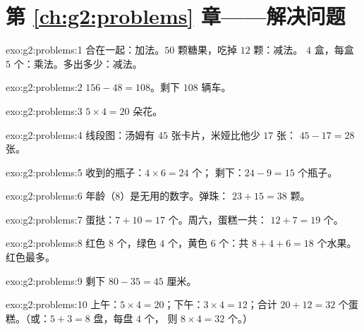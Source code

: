 \section*{第 \ref{ch:g2:problems} 章——解决问题}

\begin{solution}{exo:g2:problems:1}
合在一起：加法。$50$ 颗糖果，吃掉 $12$ 颗：减法。
$4$ 盒，每盒 $5$ 个：乘法。多出多少：减法。
\end{solution}

\begin{solution}{exo:g2:problems:2}
$156 - 48 = 108$。剩下 $108$ 辆车。
\end{solution}

\begin{solution}{exo:g2:problems:3}
$5 \times 4 = 20$ 朵花。
\end{solution}

\begin{solution}{exo:g2:problems:4}
线段图：汤姆有 $45$ 张卡片，米娅比他少 $17$ 张：
$45 - 17 = 28$ 张。
\end{solution}

\begin{solution}{exo:g2:problems:5}
收到的瓶子：$4 \times 6 = 24$ 个；
剩下：$24 - 9 = 15$ 个瓶子。
\end{solution}

\begin{solution}{exo:g2:problems:6}
年龄（$8$）是无用的数字。弹珠：
$23 + 15 = 38$ 颗。
\end{solution}

\begin{solution}{exo:g2:problems:7}
蛋挞：$7 + 10 = 17$ 个。周六，蛋糕一共：
$12 + 7 = 19$ 个。
\end{solution}

\begin{solution}{exo:g2:problems:8}
红色 $8$ 个，绿色 $4$ 个，黄色 $6$ 个：共 $8 + 4 + 6 = 18$ 个水果。
红色最多。
\end{solution}

\begin{solution}{exo:g2:problems:9}
剩下 $80 - 35 = 45$ 厘米。
\end{solution}

\begin{solution}{exo:g2:problems:10}
上午：$5 \times 4 = 20$；下午：$3 \times 4 = 12$；合计
$20 + 12 = 32$ 个蛋糕。（或：$5 + 3 = 8$ 盘，每盘 $4$ 个，
则 $8 \times 4 = 32$ 个。）
\end{solution}
